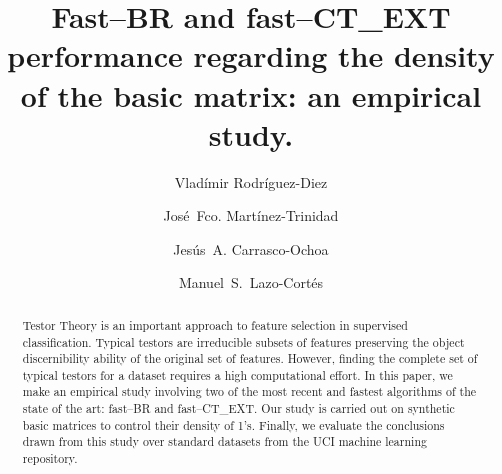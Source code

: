 \documentclass[citenumber]{llncs}
\begin{document}
\mainmatter              %
%
\title{Fast--BR and fast--CT\_EXT performance regarding the density of the basic matrix: an empirical study.}
%
			 
\author{Vlad\'{i}mir Rodr\'{i}guez-Diez \and Jos\'{e}~Fco. Mart\'{i}nez-Trinidad
		 \and Jes\'{u}s~A. Carrasco-Ochoa \and Manuel~S.~Lazo-Cortés}
%
%
%


\maketitle              %

\begin{abstract}
	Testor Theory is an important approach to feature selection in supervised classification. Typical testors are irreducible subsets of features preserving the object discernibility ability of the original set of features. However, finding the complete set of typical testors for a dataset requires a high computational effort. 
	In this paper, we make an empirical study involving two of the most recent and fastest algorithms of the state of the art: fast--BR and fast--CT\_EXT. Our study is carried out on synthetic basic matrices to control their density of 1's. Finally, we evaluate the conclusions drawn from this study over standard datasets from the UCI machine learning repository.

\end{abstract}
%
\end{document}
